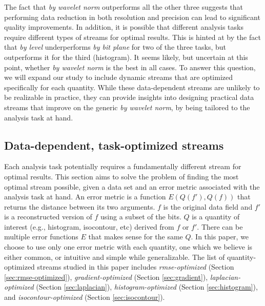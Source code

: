 The fact that \emph{by wavelet norm} outperforms all the other three suggests that performing data
reduction in both resolution and precision can lead to significant quality improvements. In
addition, it is possible that different analysis tasks require different types of streams for
optimal results. This is hinted at by the fact that \emph{by level} underperforms \emph{by bit
plane} for two of the three tasks, but outperforms it for the third (histogram). It seems likely,
but uncertain at this point, whether \emph{by wavelet norm} is the best in all cases. To answer this
question, we will expand our study to include dynamic streams that are optimized specifically for
each quantity. While these data-dependent streams are unlikely to be realizable in practice, they
can provide insights into designing practical data streams that improve on the generic \emph{by
wavelet norm}, by being tailored to the analysis task at hand.

\subsection{Data-dependent, task-optimized streams}
\label{sec:data_dep_streams}

Each analysis task potentially requires a fundamentally different stream for optimal results. This
section aims to solve the problem of finding the most optimal stream possible, given a data set and
an error metric associated with the analysis task at hand. An error metric is a function
$E(Q(f'),Q(f))$ that returns the distance between its two arguments. $f$ is the original data field
and $f'$ is a reconstructed version of $f$ using a subset of the bits. $Q$ is a quantity of interest
(e.g., histogram, isocontour, etc) derived from $f$ or $f'$. There can be multiple error functions
$E$ that makes sense for the same $Q$. In this paper, we choose to use only one error metric with
each quantity, one which we believe is either common, or intuitive and simple while generalizable.
The list of quantity-optimized streams studied in this paper includes \emph{rmse-optimized} (Section
\ref{sec:rmse-optimized}), \emph{gradient-optimized} (Section \ref{sec:gradient}),
\emph{laplacian-optimized} (Section \ref{sec:laplacian}), \emph{histogram-optimized} (Section
\ref{sec:histogram}), and \emph{isocontour-optimized} (Section \ref{sec:isocontour}).

